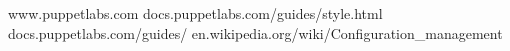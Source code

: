 \documentclass[openbib]{book}
\begin{document}
\begin{thebibliography}{99}

www.puppetlabs.com
docs.puppetlabs.com/guides/style.html
docs.puppetlabs.com/guides/
en.wikipedia.org/wiki/Configuration\_management

\end{thebibliography}
\end{document}
